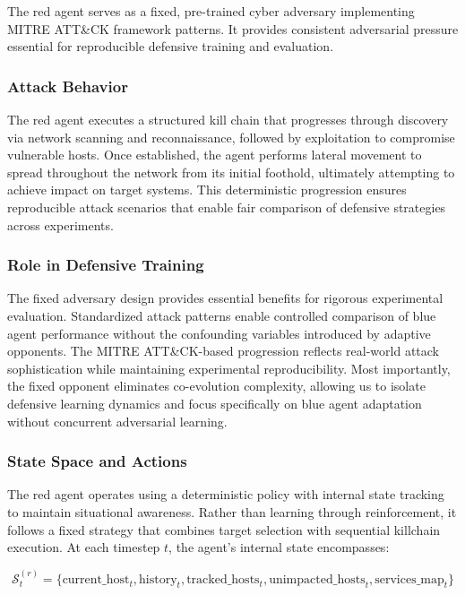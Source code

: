 \documentclass[12pt,oneside]{article}
\begin{document}
The red agent serves as a fixed, pre-trained cyber adversary implementing MITRE ATT\&CK framework patterns. It provides consistent adversarial pressure essential for reproducible defensive training and evaluation.

\subsubsection{Attack Behavior}
The red agent executes a structured kill chain that progresses through discovery via network scanning and reconnaissance, followed by exploitation to compromise vulnerable hosts. Once established, the agent performs lateral movement to spread throughout the network from its initial foothold, ultimately attempting to achieve impact on target systems. This deterministic progression ensures reproducible attack scenarios that enable fair comparison of defensive strategies across experiments.

\subsubsection{Role in Defensive Training}
The fixed adversary design provides essential benefits for rigorous experimental evaluation. Standardized attack patterns enable controlled comparison of blue agent performance without the confounding variables introduced by adaptive opponents. The MITRE ATT\&CK-based progression reflects real-world attack sophistication while maintaining experimental reproducibility. Most importantly, the fixed opponent eliminates co-evolution complexity, allowing us to isolate defensive learning dynamics and focus specifically on blue agent adaptation without concurrent adversarial learning.

\subsubsection{State Space and Actions}

The red agent operates using a deterministic policy with internal state tracking to maintain situational awareness. Rather than learning through reinforcement, it follows a fixed strategy that combines target selection with sequential killchain execution. At each timestep $t$, the agent's internal state encompasses:

\begin{equation}
\mathcal{S}^{(r)}_t = \{\text{current\_host}_t, \text{history}_t, \text{tracked\_hosts}_t, \text{unimpacted\_hosts}_t, \text{services\_map}_t\}
\end{equation}
\end{document}
